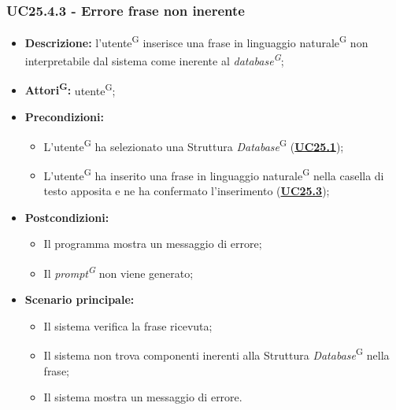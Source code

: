 \subsubsection{UC25.4.3 - Errore frase non inerente}
\label{sec:UC25.4.3}
\begin{itemize}
	\item \textbf{Descrizione:} l’utente\textsuperscript{G} inserisce una frase in linguaggio naturale\textsuperscript{G} non interpretabile dal sistema come inerente al \textit{database\textsuperscript{G}};
	\item \textbf{Attori\textsuperscript{G}:} utente\textsuperscript{G};
	\item \textbf{Precondizioni:} 
	\begin{itemize}
			\item L’utente\textsuperscript{G} ha selezionato una Struttura \textit{Database}\textsuperscript{G} (\hyperref[sec:UC25.1]{\textbf{UC25.1}});
		\item L’utente\textsuperscript{G} ha inserito una frase in linguaggio naturale\textsuperscript{G} nella casella di testo apposita e ne ha confermato l’inserimento (\hyperref[sec:UC25.3]{\textbf{UC25.3}});
	\end{itemize}
	\item \textbf{Postcondizioni:} 
	\begin{itemize}
		\item Il programma mostra un messaggio di errore;
		\item Il \textit{prompt\textsuperscript{G}} non viene generato;
	\end{itemize}
	\item \textbf{Scenario principale:} 
	\begin{itemize}
		\item Il sistema verifica la frase ricevuta;
		\item Il sistema non trova componenti inerenti alla Struttura \textit{Database}\textsuperscript{G} nella frase;
		\item Il sistema mostra un messaggio di errore.
	\end{itemize}
\end{itemize}

